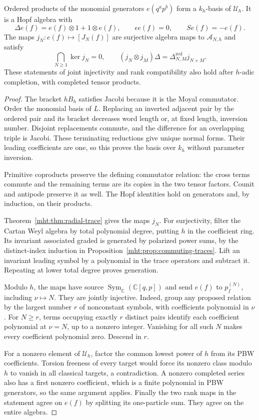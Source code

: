 \begin{theorem}\label{mht:thm:collective-moyal}
Ordered products of the monomial generators $e(q^ap^b)$ form
a $k_h$-basis of $\mathcal U_h$. It is a Hopf algebra with
\[
 \Delta e(f)=e(f)\otimes1+1\otimes e(f),\qquad
 \epsilon e(f)=0,\qquad S e(f)=-e(f).
\]
The maps $j_N:e(f)\mapsto[J_N(f)]$ are surjective algebra maps
to $\mathcal A_{N,h}$ and satisfy
\[
 \bigcap_{N\geq1}\ker j_N=0,\qquad
 (j_N\otimes j_M)\Delta
       =\Delta^{\mathrm{red}}_{N,M}j_{N+M}.
\]
These statements of joint injectivity and rank compatibility
also hold after $h$-adic completion, with completed tensor products.
\end{theorem}
\begin{proof}
The bracket $hB_h$ satisfies Jacobi because it is the Moyal
commutator. Order the monomial basis of $L$. Replacing an
inverted adjacent pair by the ordered pair and its bracket
decreases word length or, at fixed length, inversion number.
Disjoint replacements commute, and the difference for an
overlapping triple is Jacobi. These terminating reductions
give unique normal forms. Their leading coefficients are one,
so this proves the basis over $k_h$ without parameter inversion.

Primitive coproducts preserve the defining commutator relation:
the cross terms commute and the remaining terms are its copies
in the two tensor factors. Counit and antipode preserve it as
well. The Hopf identities hold on generators and, by induction,
on their products.

Theorem~\ref{mht:thm:radial-trace} gives the maps $j_N$.
For surjectivity, filter the Cartan Weyl algebra by total
polynomial degree, putting $h$ in the coefficient ring.
Its invariant associated graded is generated by polarized
power sums, by the distinct-index induction in
Proposition~\ref{mht:prop:commuting-traces}. Lift an invariant
leading symbol by a polynomial in the trace operators and
subtract it. Repeating at lower total degree proves generation.

Modulo $h$, the maps have source
$\operatorname{Sym}_{\mathbb C}(\mathbb C[q,p])$ and send
$e(f)$ to $p_f^{(N)}$, including $\nu\mapsto N$.
They are jointly injective. Indeed, group any proposed relation
by the largest number $r$ of nonconstant symbols, with
coefficients polynomial in $\nu$. For $N\geq r$, terms
occupying exactly $r$ distinct pairs identify each coefficient
polynomial at $\nu=N$, up to a nonzero integer. Vanishing for
all such $N$ makes every coefficient polynomial zero.
Descend in $r$.

For a nonzero element of $\mathcal U_h$, factor the common
lowest power of $h$ from its PBW coefficients. Torsion
freeness of every target would force its nonzero class modulo
$h$ to vanish in all classical targets, a contradiction.
A nonzero completed series also has a first nonzero coefficient,
which is a finite polynomial in PBW generators, so the same
argument applies. Finally the two rank maps in the statement
agree on $e(f)$ by splitting its one-particle sum. They agree
on the entire algebra.
\end{proof}

